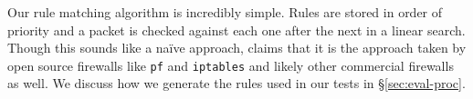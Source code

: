 Our rule matching algorithm is incredibly simple. Rules are stored in order of
priority and a packet is checked against each one after the next in a linear
search. Though this sounds like a na\"{i}ve approach, \cite{Rovniagin} claims
that it is the approach taken by open source firewalls like \texttt{pf} and
\texttt{iptables} and likely other commercial firewalls as well. We discuss how
we generate the rules used in our tests in \S\ref{sec:eval-proc}.
